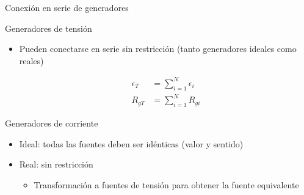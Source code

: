 \documentclass[aspectratio=169, xcolor={usenames,svgnames,dvipsnames}]{beamer}
\begin{document}

\begin{frame}{Conexión en serie de generadores}
    \begin{block}{Generadores de tensión}
    \begin{itemize}
    \item Pueden conectarse en serie \alert{sin restricción} (tanto generadores ideales como reales)

    \vspace{-5mm}
    \begin{align*}
      \epsilon_T &= \sum_{i = 1}^N \epsilon_i\\
      R_{gT} &= \sum_{i = 1}^N R_{gi}
    \end{align*}
    \end{itemize}
    \vspace{-3mm}
    \end{block}
    
    \begin{block}{Generadores de corriente}
    \begin{itemize}
    \vspace{2mm}
    \item \alert{Ideal}: todas las fuentes \alert{deben ser idénticas} (valor y sentido)
    \vspace{2mm}
    \item \alert{Real}:  sin restricción 
        \begin{itemize}
        \item \normalsize{Transformación a fuentes de tensión para obtener la \alert{fuente equivalente}}
        \end{itemize}
    \end{itemize}
    \end{block}
\end{frame}

\end{document}
